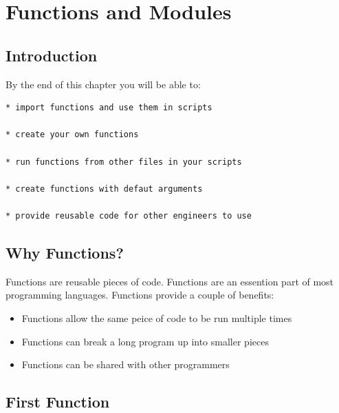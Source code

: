 \documentclass{book}
\begin{document}
    
        \chapter{Functions and Modules}\label{functions-and-modules}
    




    
        \section{Introduction}\label{introduction}
    




    
        By the end of this chapter you will be able to:

\begin{lstlisting}
* import functions and use them in scripts

* create your own functions 

* run functions from other files in your scripts

* create functions with defaut arguments

* provide reusable code for other engineers to use
\end{lstlisting}
    




    
        \section{Why Functions?}\label{why-functions}
    




    
        Functions are reusable pieces of code. Functions are an essention part
of most programming languages. Functions provide a couple of benefits:

\begin{itemize}
\item
  Functions allow the same peice of code to be run multiple times
\item
  Functions can break a long program up into smaller pieces
\item
  Functions can be shared with other programmers
\end{itemize}
    




    
        \section{First Function}\label{first-function}
    
\end{document}
